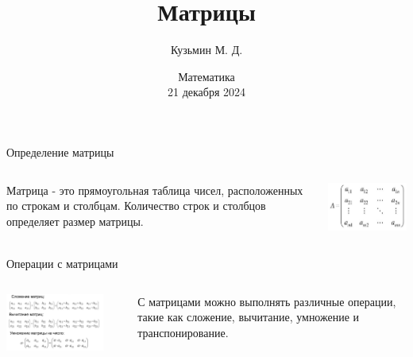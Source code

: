 \documentclass[mathserif, serif, 11pt]{beamer}
\title[Матрицы]{Матрицы}
\author[Фамилия]{Кузьмин М. Д.}
\institute[МГУ]
{
	Естественно-научный факультет МГУ им.~М.\,В.~Ломоносова
}
\date[Декабрь 2024]
{
	Математика\\
	21 декабря 2024
}
\begin{document}
	
	\frame{\titlepage}
	
	\begin{frame}{Определение матрицы}
		\begin{columns}
			\begin{column}{6cm}
				Матрица - это прямоугольная таблица чисел, расположенных по строкам и столбцам. Количество строк и столбцов определяет размер матрицы.
			\end{column}
			\begin{column}{6cm}
				\includegraphics[width=6cm]{matrix.jpg}
			\end{column}
		\end{columns}
	\end{frame}
	
	\begin{frame}{Операции с матрицами}
		\begin{columns}
			\begin{column}{6cm}
				\includegraphics[width=7cm]{oper.jpg}
			\end{column}
			\begin{column}{1cm}
			\end{column}
			\begin{column}{4cm}
				С матрицами можно выполнять различные операции, такие как сложение, вычитание, умножение и транспонирование.
			\end{column}
		\end{columns}
	\end{frame}
	
\end{document}
